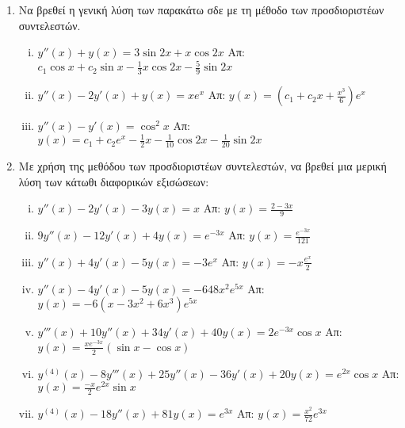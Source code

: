 


\pagestyle{askhseis}
\everymath{\displaystyle}




\begin{center}
\end{center}

\vspace{\baselineskip}

\begin{enumerate}

\item Να βρεθεί η γενική λύση των παρακάτω σδε με τη μέθοδο των προσδιοριστέων συντελεστών.

\begin{enumerate}[i)]
  \item $y''(x)+y(x)=3\sin 2x + x\cos 2x$ \hfill Απ: $c_{1}\cos x+c_{2}\sin x-\frac{1}{3}x\cos 2x-\frac{5}{9}\sin 2x $
  \item $y''(x)-2y'(x)+y(x)=xe^{x}$ \hfill Απ:  $y(x)=(c_{1}+c_{2}x+\frac{x^{3}}{6})e^{x}$
  \item $y''(x)-y'(x)=\cos^{2}x$ \hfill Απ: $y(x) =c_{1}+c_{2}e^{x}-\frac{1}{2}x-\frac{1}{10}\cos 2x- \frac{1}{20}\sin 2x$

\end{enumerate}

\item Με χρήση της μεθόδου των προσδιοριστέων συντελεστών, να βρεθεί μια μερική λύση των κάτωθι διαφορικών εξισώσεων:

\begin{enumerate}[i)]
  \item $y''(x)-2y'(x)-3y(x)=x$ \hfill Απ: $y(x)=\frac{2-3x}{9}$
  \item $9y''(x)-12y'(x)+4y(x)=e^{-3x}$ \hfill Απ: $y(x)=\frac{e^{-3x}}{121}$
  \item $y''(x)+4y'(x)-5y(x)=-3e^{x}$ \hfill Απ: $y(x)=-x\frac{e^{x}}{2}$
  \item $y''(x)-4y'(x)-5y(x)=-648x^{2}e^{5x}$ \hfill Απ: $ y(x)=-6(x-3x^{2}+6x^{3})e^{5x}$
  \item $y'''(x)+10y''(x)+34y'(x)+40y(x)=2e^{-3x}\cos x$ \hfill Απ: $y(x)= \frac{xe^{-3x}}{2}(\sin x - \cos x)$
  \item $y^{(4)}(x)-8y'''(x)+25y''(x)-36y'(x)+20y(x)=e^{2x}\cos x$ \hfill Απ: $y(x) =\frac{-x}{2}e^{2x}\sin x$
  \item $y^{(4)}(x)-18y''(x)+81y(x)=e^{3x}$ \hfill Απ: $y(x)=\frac{x^{2}}{72}e^{3x}$


\end{enumerate}
\end{enumerate}
